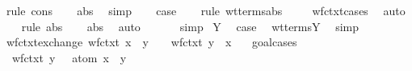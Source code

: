 \begin{isabellebody}
\ {\isacharparenleft}rule\ cons{\isacharparenright}\isanewline
\ \ \isamarkupfalse%
\ abs\ \isamarkupfalse%
\ simp{\isacharplus}\isanewline
\isanewline
\ \ \isamarkupfalse%
\ {\isacharquery}case\isanewline
\ \ \isamarkupfalse%
\ {\isacharparenleft}rule\ wt{\isacharunderscore}terms{\isachardot}abs{\isacharparenright}\isanewline
\ \ \isamarkupfalse%
\ {\isachardoublequoteopen}{}{\isachardoublequoteclose}\ wf{\isacharunderscore}ctxt{\isachardot}cases\ \isamarkupfalse%
\ auto{\isacharbrackleft}{}{\isacharbrackright}\isanewline
\ \ \isamarkupfalse%
\ {\isacharparenleft}rule\ abs{\isacharparenleft}{}{\isacharparenright}{\isacharparenright}\isanewline
\ \ \isamarkupfalse%
\ abs\ \isamarkupfalse%
\ auto{\isacharbrackleft}{}{\isacharbrackright}\isanewline
\ \ \isamarkupfalse%
\ {}\ \isamarkupfalse%
\ simp\isanewline
{}\isamarkupfalse%
\isanewline
{}\isamarkupfalse%
\ Y\ \isamarkupfalse%
\ {\isacharquery}case\ \isamarkupfalse%
\ wt{\isacharunderscore}terms{\isachardot}Y\ \isamarkupfalse%
\ simp\isanewline
{}\isamarkupfalse%
%
\endisatagproof
{\isafoldproof}%
%
\isadelimproof
\isanewline
%
\endisadelimproof
\isanewline
{}\isamarkupfalse%
\ wf{\isacharunderscore}ctxt{\isacharunderscore}exchange{\isacharcolon}\ {\isachardoublequoteopen}wf{\isacharunderscore}ctxt\ {\isacharparenleft}{\isacharparenleft}x{\isacharcomma}{\isasymsigma}{\isacharparenright}\ {\isacharhash}\ {\isacharparenleft}y{\isacharcomma}{\isasympi}{\isacharparenright}\ {\isacharhash}\ {\isasymGamma}{\isacharparenright}\ {\isasymLongrightarrow}\ wf{\isacharunderscore}ctxt\ {\isacharparenleft}{\isacharparenleft}y{\isacharcomma}{\isasympi}{\isacharparenright}\ {\isacharhash}\ {\isacharparenleft}x{\isacharcomma}{\isasymsigma}{\isacharparenright}\ {\isacharhash}\ {\isasymGamma}{\isacharparenright}{\isachardoublequoteclose}\isanewline
%
\isadelimproof
%
\endisadelimproof
%
\isatagproof
{}\isamarkupfalse%
\ goal{\isacharunderscore}cases\isanewline
{}\isamarkupfalse%
\ {}\ \isanewline
\ \ \isamarkupfalse%
\ \isamarkupfalse%
\ {}{\isacharcolon}\ {\isachardoublequoteopen}wf{\isacharunderscore}ctxt\ {\isacharparenleft}{\isacharparenleft}y{\isacharcomma}{\isasympi}{\isacharparenright}\ {\isacharhash}\ {\isasymGamma}{\isacharparenright}{\isachardoublequoteclose}\ {\isachardoublequoteopen}atom\ x\ {\isasymsharp}\ {\isacharparenleft}{\isacharparenleft}y{\isacharcomma}{\isasympi}{\isacharparenright}\ {\isacharhash}\ {\isasymGamma}{\isacharparenright}{\isachardoublequoteclose}\ \isamarkupfalse%

\end{isabellebody}
